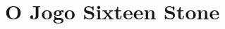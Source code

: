 \documentclass[a4paper]{article}
\begin{document}

\newpage

%
%
%
%
%
%
%



\tableofcontents
\listoffigures

\newpage


\section{O Jogo Sixteen Stone}
\end{document}
